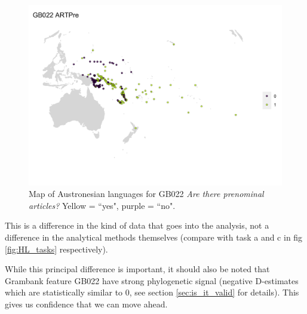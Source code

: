 \documentclass[12pt,letterpaper]{article}
\begin{document}
\begin{figure}
\centering
\includegraphics[width=16cm]{illustrations/plots_from_R/coverage_plots/maps/map_GB022.png}
\caption{{Map of Austronesian languages for GB022 \emph{Are there prenominal articles?} Yellow = ``yes", purple = ``no".}}
\label{fig:gb022_map}
\end{figure}

This is a difference in the kind of data that goes into the analysis, not a difference in the analytical methods themselves (compare with task a and c in fig \ref{fig:HL_tasks} respectively). 

While this principal difference is important, it should also be noted that Grambank feature GB022 have strong phylogenetic signal (negative D-estimates which are statistically similar to 0, see section \ref{sec:is_it_valid} for details). This gives us confidence that we can move ahead.
\end{document}
